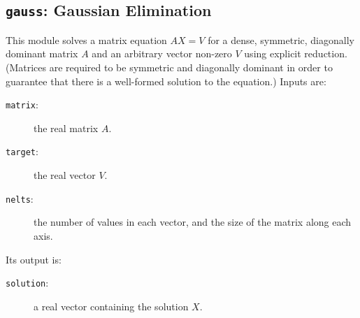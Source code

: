 \subsection{{\tt{gauss}}:
	Gaussian Elimination
	\label{s:toys-gauss}}

This module solves a matrix equation $AX=V$ for
a dense, symmetric, diagonally dominant matrix $A$
and an arbitrary vector non-zero $V$
using explicit reduction.
(Matrices are required to be symmetric and diagonally dominant in order to guarantee that
there is a well-formed solution to the equation.)
Inputs are:
\begin{description}
\item[{\tt{matrix}}:]
	the real matrix $A$.
\item[{\tt{target}}:]
	the real vector $V$.
\item[{\tt{nelts}}:]
	the number of values in each vector, and the size of the matrix along each axis.
\end{description}
Its output is:
\begin{description}
\item[{\tt{solution}}:]
	a real vector containing the solution $X$.
\end{description}
